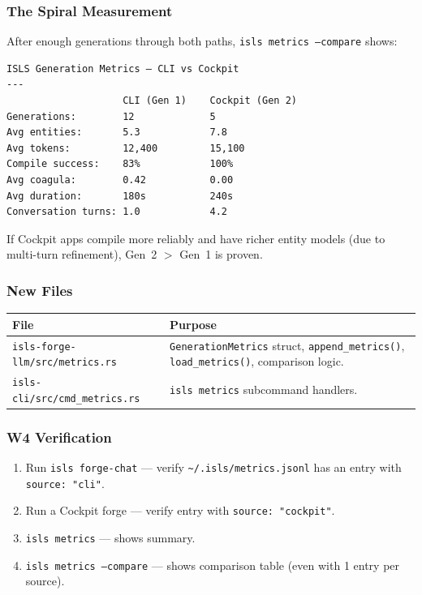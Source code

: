 \documentclass[11pt,a4paper]{article}
\begin{document}
\subsubsection{The Spiral Measurement}

After enough generations through both paths, \texttt{isls metrics 
--compare} shows:

\begin{lstlisting}[style=bash]
ISLS Generation Metrics — CLI vs Cockpit
---
                    CLI (Gen 1)    Cockpit (Gen 2)
Generations:        12             5
Avg entities:       5.3            7.8
Avg tokens:         12,400         15,100
Compile success:    83%            100%
Avg coagula:        0.42           0.00
Avg duration:       180s           240s
Conversation turns: 1.0            4.2
\end{lstlisting}

If Cockpit apps compile more reliably and have richer entity 
models (due to multi-turn refinement), Gen~2 $>$ Gen~1 is proven.

\subsubsection{New Files}

\begin{longtable}{lp{10cm}}
\toprule
\textbf{File} & \textbf{Purpose} \\
\midrule
\texttt{isls-forge-llm/src/metrics.rs}
  & \texttt{GenerationMetrics} struct, \texttt{append\_metrics()},
    \texttt{load\_metrics()}, comparison logic. \\
\texttt{isls-cli/src/cmd\_metrics.rs}
  & \texttt{isls metrics} subcommand handlers. \\
\bottomrule
\end{longtable}

\subsubsection{W4 Verification}

\begin{enumerate}[nosep]
\item Run \texttt{isls forge-chat} --- verify 
      \texttt{\textasciitilde/.isls/metrics.jsonl} has an entry 
      with \texttt{source: "cli"}.
\item Run a Cockpit forge --- verify entry with 
      \texttt{source: "cockpit"}.
\item \texttt{isls metrics} --- shows summary.
\item \texttt{isls metrics --compare} --- shows comparison table 
      (even with 1 entry per source).
\end{enumerate}
\end{document}
